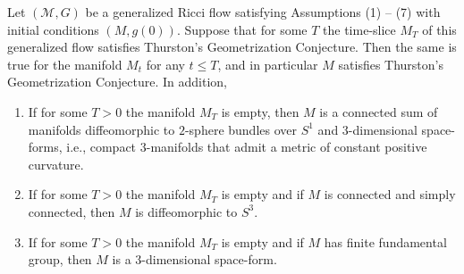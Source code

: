 \begin{corollary}
\label{cor:geometrization-inherited-across-surgery}
\label{Tgood0good}
Let $({\mathcal M},G)$ be a generalized Ricci flow satisfying Assumptions
(1) -- (7)  with initial conditions $(M,g(0))$. Suppose
that for some $T$ the time-slice $M_T$ of this generalized flow
satisfies Thurston's Geometrization Conjecture. Then the same is true for the manifold
$M_t$ for any $t\le T$, and in particular $M$ satisfies Thurston's
Geometrization Conjecture. In addition,
\begin{enumerate}
\item[(1)] If for some $T>0$ the manifold $M_T$ is empty, then $M$ is a
connected sum of manifolds diffeomorphic to $2$-sphere bundles over
$S^1$ and $3$-dimensional space-forms, i.e., compact
$3$-manifolds that admit a metric of constant positive curvature.
\item[(2)]
If for some $T>0$ the manifold $M_T$ is empty and if $M$ is connected and simply connected,
then $M$ is diffeomorphic to $S^3$.
\item[(3)]
If for some $T>0$ the manifold $M_T$ is empty and if $M$ has finite fundamental group, then $M$
is a $3$-dimensional space-form.
\end{enumerate}
\end{corollary}

